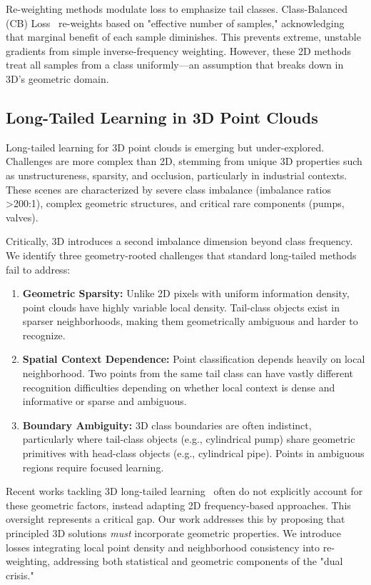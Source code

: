 \documentclass[preprint,12pt]{elsarticle}
\begin{document}
Re-weighting methods modulate loss to emphasize tail classes. Class-Balanced (CB) Loss~\cite{cui2019class} re-weights based on "effective number of samples," acknowledging that marginal benefit of each sample diminishes. This prevents extreme, unstable gradients from simple inverse-frequency weighting. However, these 2D methods treat all samples from a class uniformly—an assumption that breaks down in 3D's geometric domain.

\subsection{Long-Tailed Learning in 3D Point Clouds}
Long-tailed learning for 3D point clouds is emerging but under-explored. Challenges are more complex than 2D, stemming from unique 3D properties such as unstructureness, sparsity, and occlusion, particularly in industrial contexts. These scenes are characterized by severe class imbalance (imbalance ratios >200:1), complex geometric structures, and critical rare components (pumps, valves).

Critically, 3D introduces a second imbalance dimension beyond class frequency. We identify three geometry-rooted challenges that standard long-tailed methods fail to address:
\begin{enumerate}
    \item \textbf{Geometric Sparsity:} Unlike 2D pixels with uniform information density, point clouds have highly variable local density. Tail-class objects exist in sparser neighborhoods, making them geometrically ambiguous and harder to recognize.
    \item \textbf{Spatial Context Dependence:} Point classification depends heavily on local neighborhood. Two points from the same tail class can have vastly different recognition difficulties depending on whether local context is dense and informative or sparse and ambiguous.
    \item \textbf{Boundary Ambiguity:} 3D class boundaries are often indistinct, particularly where tail-class objects (e.g., cylindrical pump) share geometric primitives with head-class objects (e.g., cylindrical pipe). Points in ambiguous regions require focused learning.
\end{enumerate}

Recent works tackling 3D long-tailed learning~\cite{zhu2019class, cheng2023spg} often do not explicitly account for these geometric factors, instead adapting 2D frequency-based approaches. This oversight represents a critical gap. Our work addresses this by proposing that principled 3D solutions \textit{must} incorporate geometric properties. We introduce losses integrating local point density and neighborhood consistency into re-weighting, addressing both statistical and geometric components of the "dual crisis."
\end{document}

